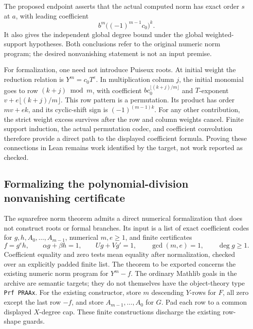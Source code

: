 The proposed endpoint asserts that the actual computed norm has exact
order \(s\) at \(a\), with leading coefficient
\[
 b^m\bigl((-1)^{m-1}c_0\bigr)^k.
\]
It also gives the independent global degree bound under the global
weighted-support hypotheses.  Both conclusions refer to the original
numeric norm program; the desired nonvanishing statement is not an
input premise.

For formalization, one need not introduce Puiseux roots.  At initial
weight the reduction relation is \(Y^m=c_0T^e\).  In multiplication
column \(j\), the initial monomial goes to row
\((k+j)\bmod m\), with coefficient
\(b c_0^{\lfloor(k+j)/m\rfloor}\) and \(T\)-exponent
\(v+e\lfloor(k+j)/m\rfloor\).
This row pattern is a permutation.  Its product has order \(mv+ek\),
and its cyclic-shift sign is \((-1)^{(m-1)k}\).
For any other contribution, the strict weight excess survives after the
row and column weights cancel.  Finite support induction, the actual
permutation codec, and coefficient convolution therefore provide a direct
path to the displayed coefficient formula.  Proving these connections in
Lean remains work identified by the target, not work reported as checked.

\subsection{Formalizing the polynomial-division nonvanishing certificate}
\label{sec:squarefree-lean}

The squarefree norm theorem admits a direct numerical formalization that
does not construct roots or formal branches.  Its input is a list of
exact coefficient codes for \(g,h,A_0,\ldots,A_{m-1}\), numerical
\(m,e\geq1\), and finite certificates
\[
 f=g^e h,\qquad \alpha g+\beta h=1,\qquad
 Ug+Vg'=1,\qquad \gcd(m,e)=1,\qquad\deg g\geq1.
\]
Coefficient equality and zero tests mean equality after normalization,
checked over an explicitly padded finite list.  The theorem to be
exported concerns the existing numeric norm program for \(Y^m-f\).
The ordinary Mathlib goals in the archive are semantic targets; they do
not themselves have the object-theory type \texttt{Prf PRAAx}.
For the existing constructor, store \(m\) descending \(Y\)-rows for
\(F\), all zero except the last row \(-f\), and store
\(A_{m-1},\ldots,A_0\) for \(G\).  Pad each row to a common
displayed \(X\)-degree cap.  These finite constructions discharge the
existing row-shape guards.

